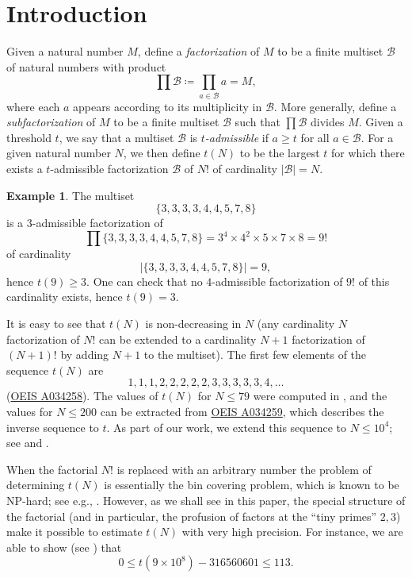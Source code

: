 \documentclass[10pt,a4paper,reqno]{amsart}
\numberwithin{equation}{section}
\theoremstyle{plain}
\theoremstyle{definition}
\newtheorem{example}[example]{Example}
\newcommand\tuple{{\mathcal B}}
\begin{document}

\section{Introduction}

Given a natural number $M$, define a \emph{factorization} of $M$ to be a finite multiset $\tuple$ of natural numbers with product
$$ \prod \tuple \coloneqq \prod_{a \in \tuple} a = M,$$
where each $a$ appears according to its multiplicity in $\tuple$. More generally, define a \emph{subfactorization} of $M$ to be a finite multiset $\tuple$ such that $\prod \tuple$ divides $M$.  Given a threshold $t$, we say that a multiset $\tuple$ is \emph{$t$-admissible} if $a \geq t$ for all $a \in \tuple$.  For a given natural number $N$, we then define $t(N)$ to be the largest $t$ for which there exists a $t$-admissible factorization $\tuple$ of $N!$ of cardinality $|\tuple|=N$.

\begin{example}\label{nine}  The multiset
  $$ \{ 3,3,3,3,4,4,5,7,8\}$$
  is a $3$-admissible factorization of
$$ \prod \{ 3,3,3,3,4,4,5,7,8\} = 3^4 \times 4^2 \times 5 \times 7 \times 8 = 9!$$
of cardinality
$$|\{ 3,3,3,3,4,4,5,7,8\}| = 9,$$
 hence $t(9) \geq 3$.  One can check that no $4$-admissible factorization of $9!$ of this cardinality exists, hence $t(9) = 3$.
\end{example}

It is easy to see that $t(N)$ is non-decreasing in $N$ (any cardinality $N$ factorization of $N!$ can be extended to a cardinality $N+1$ factorization of $(N+1)!$ by adding $N+1$ to the multiset).  The first few elements of the sequence $t(N)$ are
$$ 1,1,1,2,2,2,2,2,3,3,3,3,3,4, \dots$$
(\href{https://oeis.org/A034258}{OEIS A034258}). The values of $t(N)$ for $N \leq 79$ were computed in \cite{guy-selfridge}, and the values for $N \leq 200$ can be extracted from \href{https://oeis.org/A034259}{OEIS A034259}, which describes the inverse sequence to $t$.  As part of our work, we extend this sequence to $N \leq 10^4$; see \cite{github} and .

When the factorial $N!$ is replaced with an arbitrary number the problem of determining $t(N)$ is essentially the bin covering problem, which is known to be NP-hard; see e.g., \cite{bincover}.  However, as we shall see in this paper, the special structure of the factorial (and in particular, the profusion of factors at the ``tiny primes'' $2,3$) make it possible to estimate $t(N)$ with very high precision.  For instance, we are able to show (see ) that
$$ 0 \leq t(9 \times 10^8) - \num{316560601} \leq 113.$$
\end{document}
